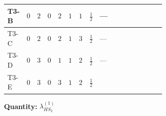 \documentclass[8pt]{article}
\begin{document}
\begin{landscape}
\begin{longtable}{@{}llcccccc >{\raggedright\arraybackslash}p{0.21\linewidth} >{\raggedright\arraybackslash}p{0.21\linewidth} >{\raggedright\arraybackslash}p{0.21\linewidth}@{}}
\midrule
T3-B & $0$ & $2$ & $0$ & $2$ & $1$ & $1$ & $\frac{1}{2}$ & --- & \scriptsize\adjustbox{max width=\linewidth}{$\begin{gathered} -2 \operatorname{Tr}\!\left({y_2}\,\left({y_2}\right)^{\dagger}\,{Y_e}\,\left({Y_e}\right)^{\dagger}\right)\end{gathered}$} & \scriptsize\adjustbox{max width=\linewidth}{$\begin{gathered} +6 {\lambda_5} \left({\lambda_5}\right)^{*}\end{gathered}$} \\
\midrule
T3-C & $0$ & $2$ & $0$ & $2$ & $1$ & $3$ & $\frac{1}{2}$ & --- & \scriptsize\adjustbox{max width=\linewidth}{$\begin{gathered} -3 \operatorname{Tr}\!\left({y_2}\,\left({y_2}\right)^{\dagger}\,{Y_e}\,\left({Y_e}\right)^{\dagger}\right)\end{gathered}$} & \scriptsize\adjustbox{max width=\linewidth}{$\begin{gathered} +6 {\lambda_5} \left({\lambda_5}\right)^{*}\end{gathered}$} \\
\midrule
T3-D & $0$ & $3$ & $0$ & $1$ & $1$ & $2$ & $\frac{1}{2}$ & --- & \scriptsize\adjustbox{max width=\linewidth}{$\begin{gathered} -4 \operatorname{Tr}\!\left({y_2}\,\left({y_2}\right)^{\dagger}\,{Y_e}\,\left({Y_e}\right)^{\dagger}\right)\end{gathered}$} & \scriptsize\adjustbox{max width=\linewidth}{$\begin{gathered} +12 {\lambda_5} \left({\lambda_5}\right)^{*}\end{gathered}$} \\
\midrule
T3-E & $0$ & $3$ & $0$ & $3$ & $1$ & $2$ & $\frac{1}{2}$ & \scriptsize\adjustbox{max width=\linewidth}{$\begin{gathered} {\lambda_{HS_2}^{(1)}} (2 T_{\nu}^{(2)}+6 \operatorname{Tr}\!\left({Y_d}\,\left({Y_d}\right)^{\dagger}\right)+2 \operatorname{Tr}\!\left({Y_e}\,\left({Y_e}\right)^{\dagger}\right)+6 \operatorname{Tr}\!\left({Y_u}\,\left({Y_u}\right)^{\dagger}\right)+4 {\lambda_{S_2}^{(A)}})\end{gathered}$} & \scriptsize\adjustbox{max width=\linewidth}{$\begin{gathered} -2 \operatorname{Tr}\!\left({y_2}\,\left({y_2}\right)^{\dagger}\,{Y_e}\,\left({Y_e}\right)^{\dagger}\right)\end{gathered}$} & \scriptsize\adjustbox{max width=\linewidth}{$\begin{gathered} +4 {\lambda_5} \left({\lambda_5}\right)^{*}\end{gathered}$} \\
\midrule
\bottomrule
\end{longtable}
\clearpage
\noindent\textbf{Quantity: }$\lambda_{HS_2}^{(1)}$\par\smallskip

\end{landscape}
\end{document}

